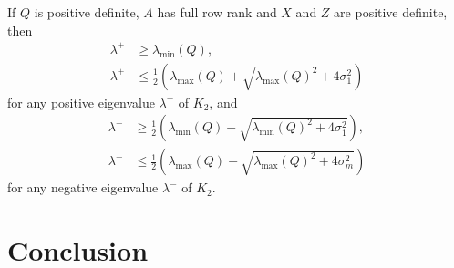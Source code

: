\documentclass{amsart}
\begin{document}
\begin{blemma}
  \label{lem:eigs-RW}
  If $Q$ is positive definite,
  $A$ has full row rank and $X$ and $Z$ are positive definite,
  then
  \begin{align*}
    \lambda^+ & \geq \lambda_{\min}(Q), \\
    \lambda^+ & \leq
      \tfrac{1}{2}
      \left(
        \lambda_{\max}(Q) + \sqrt{\lambda_{\max}(Q)^2 + 4 \sigma_1^2}
      \right)
  \end{align*}
  for any positive eigenvalue $\lambda^+$ of $K_2$, and
  \begin{align*}
    \lambda^- & \geq
      \tfrac{1}{2}
      \left(
        \lambda_{\min}(Q) - \sqrt{\lambda_{\min}(Q)^2 + 4 \sigma_1^2}
      \right), \\
    \lambda^- & \leq
      \tfrac{1}{2}
      \left(
        \lambda_{\max}(Q) - \sqrt{\lambda_{\max}(Q)^2 + 4 \sigma_m^2}
      \right)
  \end{align*}
  for any negative eigenvalue $\lambda^-$ of $K_2$.
\end{blemma}

\section{Conclusion}




\end{document}
